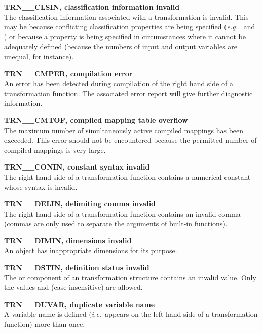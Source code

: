 \begin{description}

\item {\bf TRN\_\_CLSIN, classification information invalid}\\
The classification information associated with a transformation is invalid.
This may be because conflicting classification properties are being 
specified ({\em e.g.}\  and ) or
because a property is being specified in circumstances where it cannot be
adequately defined (because the numbers of input and output variables
are unequal, for instance). 

\item {\bf TRN\_\_CMPER, compilation error}\\
An error has been detected during compilation of the right hand side of a
transformation function. 
The associated error report will give further diagnostic information.

\item {\bf TRN\_\_CMTOF, compiled mapping table overflow}\\
The maximum number of simultaneously active compiled mappings has
been exceeded.
This error should not be encountered because the permitted number of
compiled mappings is very large. 

\item {\bf TRN\_\_CONIN, constant syntax invalid}\\
The right hand side of a transformation function contains a numerical
constant whose syntax is invalid. 

\item {\bf TRN\_\_DELIN, delimiting comma invalid}\\
The right hand side of a transformation function contains an invalid comma
(commas are only used to separate the arguments of built-in functions). 

\item {\bf TRN\_\_DIMIN, dimensions invalid}\\
An  object has inappropriate dimensions for its purpose. 

\item {\bf TRN\_\_DSTIN, definition status invalid}\\
The  or  component of an 
transformation structure contains an invalid value.
Only the values  and  (case insensitive)
are allowed. 

\item {\bf TRN\_\_DUVAR, duplicate variable name}\\
A variable name is defined ({\em i.e.}\ appears on the left hand side of a
transformation function) more than once. 


\end{description}
